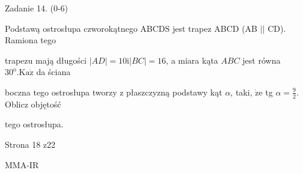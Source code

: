 \documentclass[a4paper,12pt]{article}
\begin{document}
Zadanie 14. (0-6)

Podstawą ostrosłupa czworokątnego ABCDS jest trapez ABCD (AB $||$ CD). Ramiona tego

trapezu mają długości $|AD|=10 \mathrm{i}|BC|=16$, a miara kąta $ABC$ jest równa $30^{\mathrm{o}}. \mathrm{K}\mathrm{a}\dot{\mathrm{z}}$ da ściana

boczna tego ostrosłupa tworzy z płaszczyzną podstawy kąt $\alpha$, taki, $\dot{\mathrm{z}}\mathrm{e}$ tg $\displaystyle \alpha=\frac{9}{2}$. Oblicz objętość

tego ostrosłupa.

Strona 18 z22

MMA-IR
\end{document}
